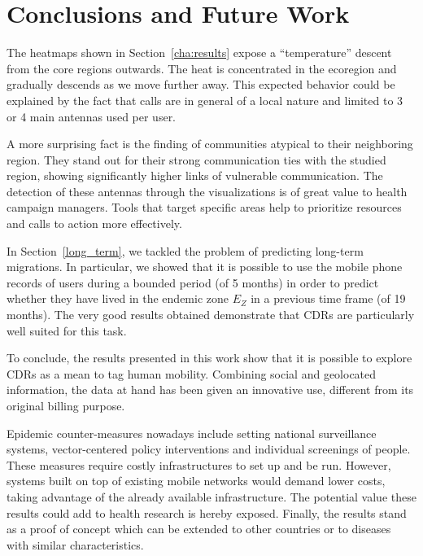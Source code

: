 
\chapter{Conclusions and Future Work}
\label{cha:evaluation-results}

The heatmaps shown in Section~\ref{cha:results} expose a ``temperature'' descent from the core regions outwards. The heat is concentrated in the ecoregion and gradually descends as we move further away. This expected behavior could be explained by the fact that calls are in general of a local nature and limited to 3 or 4 main antennas used per user. 

A more surprising fact is the finding of communities atypical to their neighboring region. They stand out for their strong communication ties with the studied region, showing significantly higher links of vulnerable communication. The detection of these antennas through the visualizations is of great value to health campaign managers. Tools that target specific areas help to prioritize resources and calls to action more effectively.

In Section~\ref{long_term}, we tackled the problem of predicting long-term migrations. In particular, we showed that it is possible to use the mobile phone records of users during a bounded period (of 5 months) in order to predict whether they have lived in the endemic zone $E_Z$ in a previous time frame (of 19 months).
The very good results obtained demonstrate that CDRs are particularly well suited for this task.

To conclude, the results presented in this work show that it is possible to explore CDRs as a mean to tag human mobility. Combining social and geolocated information, the data at hand has been given an innovative use, different from its original billing purpose.

Epidemic counter-measures nowadays include setting national surveillance systems, vector-centered policy interventions and individual screenings of people. These measures require costly infrastructures to set up and be run. However, systems built on top of existing mobile networks would demand lower costs, taking advantage of the already available infrastructure. The potential value these results could add to health research is hereby exposed.
Finally, the results stand as a proof of concept which can be extended to other countries or to diseases with similar characteristics.



